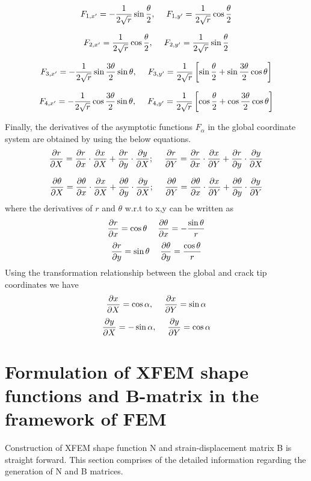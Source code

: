\documentclass[fleqn, 12.5pt,a4paper]{report}
\newcommand\tab[1][1cm]{\hspace*{#1}}
\begin{document}
$$F_{1,x'} = -\frac{1}{2\sqrt r} \sin\frac{\theta}{2}, \tab[0.45cm] F_{1,y'} = \frac{1}{2\sqrt r} \cos\frac{\theta}{2}$$

$$F_{2,x'} = \frac{1}{2\sqrt r} \cos\frac{\theta}{2}, \tab[0.45cm] F_{2,y'} = \frac{1}{2\sqrt r} \sin\frac{\theta}{2}$$

$$F_{3,x'} = -\frac{1}{2\sqrt r} \sin\frac{3\theta}{2} \sin\theta, \tab[0.45cm] F_{3,y'} = \frac{1}{2\sqrt r} \left[\sin\frac{\theta}{2} + \sin\frac{3\theta}{2} \cos\theta \right]$$

$$F_{4,x'} = -\frac{1}{2\sqrt r} \cos\frac{3\theta}{2} \sin\theta, \tab[0.45cm] F_{4,y'} = \frac{1}{2\sqrt r} \left[\cos\frac{\theta}{2} + \cos\frac{3\theta}{2} \cos\theta \right]$$\newline

Finally, the derivatives of the asymptotic functions $F_{\alpha}$ \cite{mohammadi2008extended} in the global coordinate system are obtained by using the below equations.
$$\pdv{r}{X} = \pdv{r}{x} \cdot \pdv{x}{X} + \pdv{r}{y} \cdot \pdv{y}{X}; \tab[0.45cm] \pdv{r}{Y} = \pdv{r}{x} \cdot \pdv{x}{Y} + \pdv{r}{y} \cdot \pdv{y}{X}$$

$$\pdv{\theta}{X} = \pdv{\theta}{x} \cdot \pdv{x}{X} + \pdv{\theta}{y} \cdot \pdv{y}{X}; \tab[0.45cm] \pdv{\theta}{Y} = \pdv{\theta}{x} \cdot \pdv{x}{Y} + \pdv{\theta}{y} \cdot \pdv{y}{Y}$$\newline
where the derivatives of $r$ and $\theta$ w.r.t to x,y \cite{mohammadi2008extended} can be written as\newline
$$\pdv{r}{x} = \cos\theta \tab[0.45cm] \pdv{\theta}{x} = -\frac{\sin\theta}{r}$$
$$\pdv{r}{y} = \sin\theta \tab[0.45cm] \pdv{\theta}{y} = \frac{\cos\theta}{r}$$\newline 
Using the transformation relationship between the global and crack tip coordinates we have\newline
$$\pdv{x}{X} = \cos\alpha, \tab[0.45cm] \pdv{x}{Y} = \sin\alpha$$
$$\pdv{y}{X} = -\sin\alpha, \tab[0.45cm] \pdv{y}{Y} = \cos\alpha $$


\section{\color{Black} \large{Formulation of XFEM shape functions and B-matrix in the framework of FEM}}

Construction of XFEM shape function N and strain-displacement matrix B is straight forward. This section comprises of the detailed information regarding the generation of N and B matrices.
\end{document}
